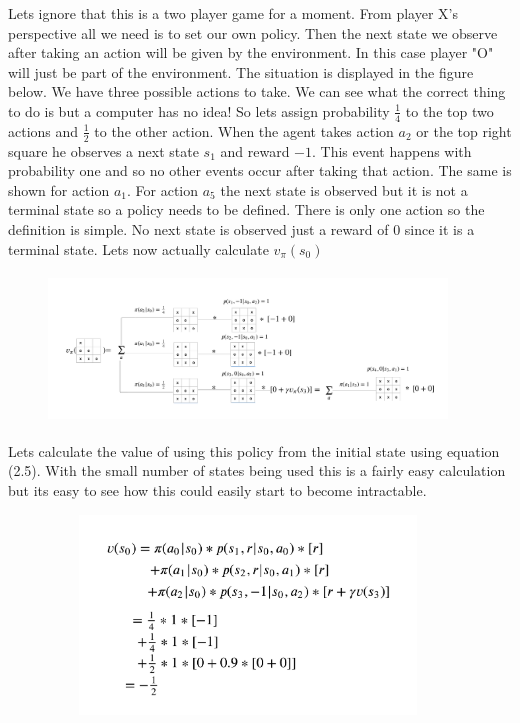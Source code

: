 Lets ignore that this is a two player game for a moment. From player X's perspective all we need is to set our own policy. Then the next state we observe after taking an action will be given by the environment. In this case player "O" will just be part of the environment. The situation is displayed in the figure below. We have three possible actions to take. We can see what the correct thing to do is but a computer has no idea! So lets assign probability $\frac{1}{4}$ to the top two actions and $\frac{1}{2}$ to the other action. When the agent takes action $a_{2}$ or the top right square he observes a next state $s_{1}$ and reward $-1$. This event happens with probability one and so no other events occur after taking that action. The same is shown for action $a_{1}$. For action $a_{5}$ the next state is observed but it is not a terminal state so a policy needs to be defined. There is only one action so the definition is simple. No next state is observed just a reward of 0 since it is a terminal state. Lets now actually calculate $v_{\pi}(s_{0})$ 

\begin{figure}[H]
        \centering
        \includegraphics[width=400px,height=150px]{images/PolicyEvaluationExample/value_function.png}
        \caption{}
        \label{fig:my_label}
\end{figure}

Lets calculate the value of using this policy from the initial state using equation (2.5). With the small number of states being used this is a fairly easy calculation but its easy to see how this could easily start to become intractable. 

\begin{figure}[H]
        \centering
        \includegraphics[width=400px,height=200px]{images/PolicyEvaluationExample/value_function_calc.png}
        \caption{}
        \label{fig:my_label}
\end{figure}


